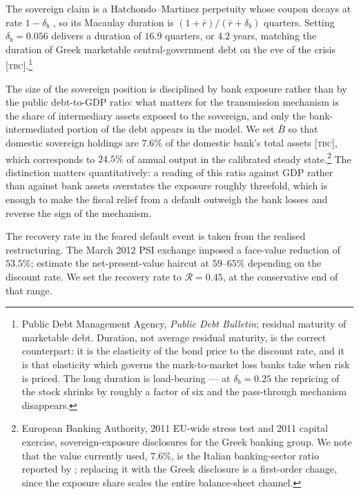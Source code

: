 The sovereign claim is a Hatchondo--Martinez perpetuity whose coupon decays at
rate $1-\delta_b$ \citep{hatchondomartinez2009}, so its Macaulay duration is
$(1+\bar r)/(\bar r+\delta_b)$ quarters. Setting $\delta_b=0.056$ delivers a
duration of $16.9$ quarters, or $4.2$ years, matching the duration of Greek
marketable central-government debt on the eve of the crisis
[\textsc{tbc}].\footnote{Public Debt Management Agency, \emph{Public Debt
Bulletin}; residual maturity of marketable debt. Duration, not average residual
maturity, is the correct counterpart: it is the elasticity of the bond price to
the discount rate, and it is that elasticity which governs the mark-to-market
loss banks take when risk is priced. The long duration is load-bearing --- at
$\delta_b=0.25$ the repricing of the stock shrinks by roughly a factor of six
and the pass-through mechanism disappears.}

The size of the sovereign position is disciplined by bank exposure rather than by
the public debt-to-GDP ratio: what matters for the transmission mechanism is the
share of intermediary assets exposed to the sovereign, and only the
bank-intermediated portion of the debt appears in the model. We set
$\bar B$ so that domestic sovereign holdings are $7.6\%$ of the domestic bank's
total assets [\textsc{tbc}], which corresponds to $24.5\%$ of annual output in
the calibrated steady state.\footnote{European Banking Authority, 2011 EU-wide
stress test and 2011 capital exercise, sovereign-exposure disclosures for the
Greek banking group. We note that the value currently used, $7.6\%$, is the
Italian banking-sector ratio reported by \citet{bocola2016}; replacing it with
the Greek disclosure is a first-order change, since the exposure share scales the
entire balance-sheet channel.} The distinction matters quantitatively: a reading
of this ratio against GDP rather than against bank assets overstates the exposure
roughly threefold, which is enough to make the fiscal relief from a default
outweigh the bank losses and reverse the sign of the mechanism.

The recovery rate in the feared default event is taken from the realised
restructuring. The March 2012 PSI exchange imposed a face-value reduction of
$53.5\%$; \citet{zettelmeyer2013} estimate the net-present-value haircut at
$59$--$65\%$ depending on the discount rate. We set the recovery rate to
$\mathcal{R}=0.45$, at the conservative end of that range.

